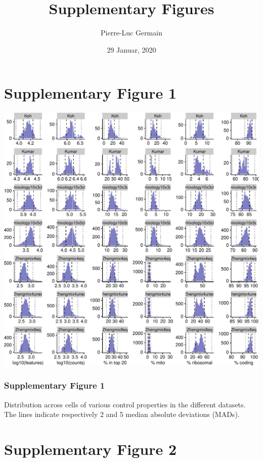 \documentclass[]{article}
\title{Supplementary Figures}
\author{Pierre-Luc Germain}
\date{29 Januar, 2020}
\begin{document}
\maketitle

{
\setcounter{tocdepth}{2}
\tableofcontents
}
\newpage

\hypertarget{supplementary-figure-1}{%
\section{Supplementary Figure 1}\label{supplementary-figure-1}}

\includegraphics{supp_figures_files/figure-latex/dist_cell_properties-1.pdf}

\hypertarget{supplementary-figure-1-1}{%
\subsubsection{Supplementary Figure 1}\label{supplementary-figure-1-1}}

Distribution across cells of various control properties in the different
datasets. The lines indicate respectively 2 and 5 median absolute
deviations (MADs).

\newpage

\hypertarget{supplementary-figure-2}{%
\section{Supplementary Figure 2}\label{supplementary-figure-2}}
\end{document}
